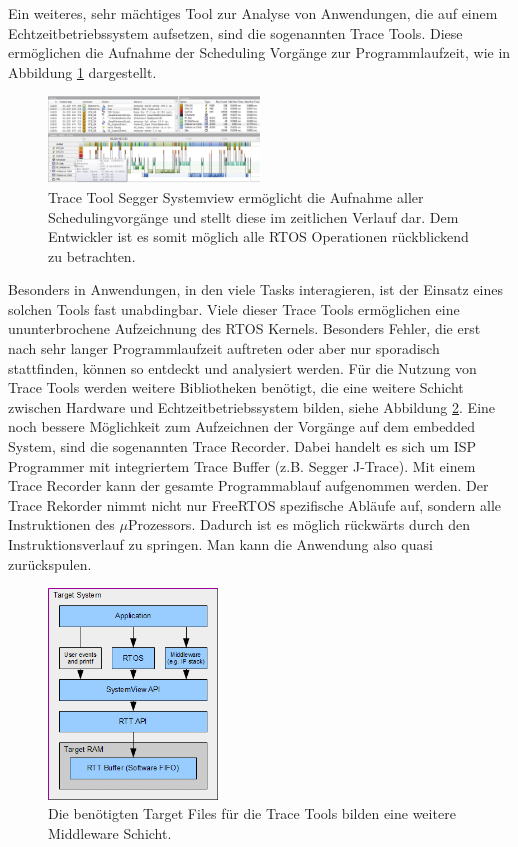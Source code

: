 Ein weiteres, sehr mächtiges Tool zur Analyse von Anwendungen, die auf einem Echtzeitbetriebssystem aufsetzen, sind die sogenannten Trace Tools. Diese ermöglichen die Aufnahme der Scheduling Vorgänge zur Programmlaufzeit, wie in Abbildung \ref {fig:Systemview} dargestellt. 
\begin{figure}[hbt]
	\centering
		\includegraphics[width=0.5\textwidth]{Pictures/Segger/systemview.png}
	\caption{Trace Tool Segger Systemview ermöglicht die Aufnahme aller Schedulingvorgänge und stellt diese im zeitlichen Verlauf dar. Dem Entwickler ist es somit möglich alle RTOS Operationen rückblickend zu betrachten.}
	\label{fig:Systemview}
\end{figure}
Besonders in Anwendungen, in den viele Tasks interagieren, ist der Einsatz eines solchen Tools fast unabdingbar. Viele dieser Trace Tools ermöglichen eine ununterbrochene Aufzeichnung des RTOS Kernels. Besonders Fehler, die erst nach sehr langer Programmlaufzeit auftreten oder aber nur sporadisch stattfinden, können so entdeckt und analysiert werden. Für die Nutzung von Trace Tools werden weitere Bibliotheken benötigt, die eine weitere Schicht zwischen Hardware und Echtzeitbetriebssystem bilden, siehe Abbildung \ref{fig:SystemviewTarget}. Eine noch bessere Möglichkeit zum Aufzeichnen der Vorgänge auf dem embedded System, sind die sogenannten Trace Recorder. Dabei handelt es sich um ISP Programmer mit integriertem Trace Buffer (z.B. Segger J-Trace). Mit einem Trace Recorder kann der gesamte Programmablauf aufgenommen werden. Der Trace Rekorder nimmt nicht nur FreeRTOS spezifische Abläufe auf, sondern alle Instruktionen des $\mu$Prozessors. Dadurch ist es möglich rückwärts durch den Instruktionsverlauf zu springen. Man kann die Anwendung also quasi zurückspulen.
\begin{figure}[hbt]
	\centering
		\includegraphics[width=0.4\textwidth]{Pictures/Segger/SystemViewTarget.png}
	\caption{Die benötigten Target Files für die Trace Tools bilden eine weitere Middleware Schicht.}
	\label{fig:SystemviewTarget}
\end{figure}
